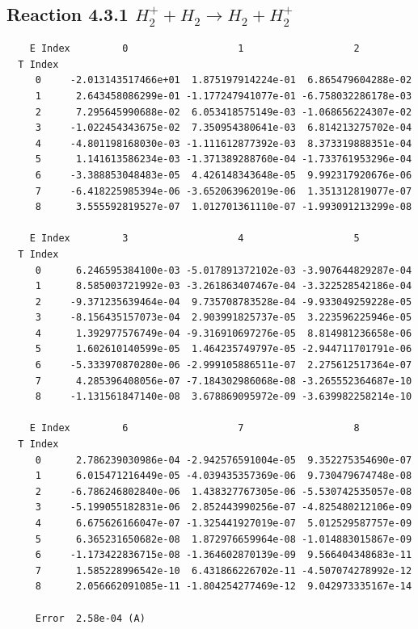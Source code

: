 \documentclass[12pt,dvipdfmx]{article}
\begin{document}
\newpage
\subsection{
Reaction 4.3.1 $   H_2^+ + H_2 \rightarrow H_2 + H_2^+$}


\begin{small}\begin{verbatim}
    E Index         0                   1                   2
  T Index
     0     -2.013143517466e+01  1.875197914224e-01  6.865479604288e-02
     1      2.643458086299e-01 -1.177247941077e-01 -6.758032286178e-03
     2      7.295645990688e-02  6.053418575149e-03 -1.068656224307e-02
     3     -1.022454343675e-02  7.350954380641e-03  6.814213275702e-04
     4     -4.801198168030e-03 -1.111612877392e-03  8.373319888351e-04
     5      1.141613586234e-03 -1.371389288760e-04 -1.733761953296e-04
     6     -3.388853048483e-05  4.426148343648e-05  9.992317920676e-06
     7     -6.418225985394e-06 -3.652063962019e-06  1.351312819077e-07
     8      3.555592819527e-07  1.012701361110e-07 -1.993091213299e-08

    E Index         3                   4                   5
  T Index
     0      6.246595384100e-03 -5.017891372102e-03 -3.907644829287e-04
     1      8.585003721992e-03 -3.261863407467e-04 -3.322528542186e-04
     2     -9.371235639464e-04  9.735708783528e-04 -9.933049259228e-05
     3     -8.156435157073e-04  2.903991825737e-05  3.223596225946e-05
     4      1.392977576749e-04 -9.316910697276e-05  8.814981236658e-06
     5      1.602610140599e-05  1.464235749797e-05 -2.944711701791e-06
     6     -5.333970870280e-06 -2.999105886511e-07  2.275612517364e-07
     7      4.285396408056e-07 -7.184302986068e-08 -3.265552364687e-10
     8     -1.131561847140e-08  3.678869095972e-09 -3.639982258214e-10

    E Index         6                   7                   8
  T Index
     0      2.786239030986e-04 -2.942576591004e-05  9.352275354690e-07
     1      6.015471216449e-05 -4.039435357369e-06  9.730479674748e-08
     2     -6.786246802840e-06  1.438327767305e-06 -5.530742535057e-08
     3     -5.199055182831e-06  2.852443990256e-07 -4.825480212106e-09
     4      6.675626166047e-07 -1.325441927019e-07  5.012529587757e-09
     5      6.365231650682e-08  1.872976659964e-08 -1.014883015867e-09
     6     -1.173422836715e-08 -1.364602870139e-09  9.566404348683e-11
     7      1.585228996542e-10  6.431866226702e-11 -4.507074278992e-12
     8      2.056662091085e-11 -1.804254277469e-12  9.042973335167e-14

     Error  2.58e-04 (A)
\end{verbatim}\end{small}
\end{document}
